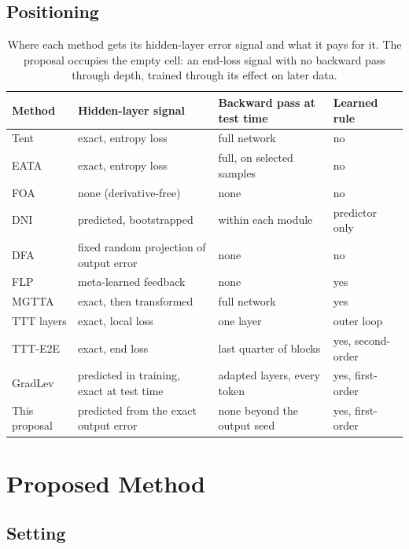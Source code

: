 \documentclass{article}
\begin{document}
\subsection{Positioning}

\begin{table}[ht]
\centering
\small
\begin{tabular}{L{3.0cm} L{4.4cm} L{3.6cm} L{3.4cm}}
\toprule
Method & Hidden-layer signal & Backward pass at test time & Learned rule \\
\midrule
Tent & exact, entropy loss & full network & no \\
EATA & exact, entropy loss & full, on selected samples & no \\
FOA & none (derivative-free) & none & no \\
DNI & predicted, bootstrapped & within each module & predictor only \\
DFA & fixed random projection of output error & none & no \\
FLP & meta-learned feedback & none & yes \\
MGTTA & exact, then transformed & full network & yes \\
TTT layers & exact, local loss & one layer & outer loop \\
TTT-E2E & exact, end loss & last quarter of blocks & yes, second-order \\
GradLev & predicted in training, exact at test time & adapted layers, every token & yes, first-order \\
\midrule
This proposal & predicted from the exact output error & none beyond the output seed & yes, first-order \\
\bottomrule
\end{tabular}
\caption{Where each method gets its hidden-layer error signal and what it pays
for it. The proposal occupies the empty cell: an end-loss signal with no
backward pass through depth, trained through its effect on later data.}
\label{tab:positioning}
\end{table}

\section{Proposed Method}
\label{sec:method}

\subsection{Setting}
\end{document}
